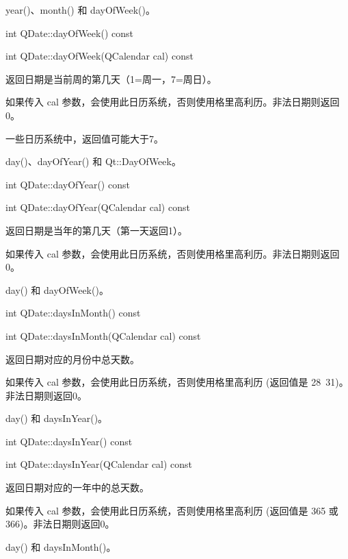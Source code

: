\begin{notice}[另请参阅]
year()、month() 和 dayOfWeek()。
\end{notice}

\splitLine

int QDate::dayOfWeek() const

int QDate::dayOfWeek(QCalendar cal) const

返回日期是当前周的第几天（1=周一，7=周日）。

如果传入 cal 参数，会使用此日历系统，否则使用格里高利历。非法日期则返回0。

一些日历系统中，返回值可能大于7。

\begin{notice}[另请参阅]
day()、dayOfYear() 和 Qt::DayOfWeek。
\end{notice}

\splitLine

int QDate::dayOfYear() const

int QDate::dayOfYear(QCalendar cal) const

返回日期是当年的第几天（第一天返回1）。

如果传入 cal 参数，会使用此日历系统，否则使用格里高利历。非法日期则返回0。

\begin{notice}[另请参阅]
day() 和 dayOfWeek()。
\end{notice}

\splitLine

int QDate::daysInMonth() const

int QDate::daysInMonth(QCalendar cal) const

返回日期对应的月份中总天数。

如果传入 cal 参数，会使用此日历系统，否则使用格里高利历 (返回值是 28~31)。非法日期则返回0。



\begin{notice}[另请参阅]
day() 和 daysInYear()。
\end{notice}

\splitLine

int QDate::daysInYear() const

int QDate::daysInYear(QCalendar cal) const

返回日期对应的一年中的总天数。

如果传入 cal 参数，会使用此日历系统，否则使用格里高利历 (返回值是 365 或 366)。非法日期则返回0。



\begin{notice}[另请参阅]
day() 和 daysInMonth()。
\end{notice}

